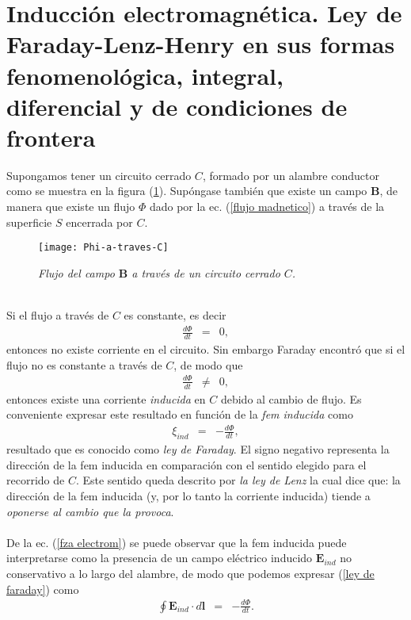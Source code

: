 
\section{Inducción electromagnética. Ley de Faraday-Lenz-Henry en sus formas fenomenológica, integral, diferencial y de condiciones de frontera}
Supongamos tener un circuito cerrado $C$, formado por un alambre conductor como se muestra en la figura (\ref{Phi-a-traves-C}). Supóngase también que existe un campo $\textbf{B}$, de manera que existe un flujo $\Phi$ dado por la ec. (\ref{flujo madnetico}) a través de la superficie $S$ encerrada por $C$.\\
\begin{figure}[h]
  \centering
    \texttt{[image: Phi-a-traves-C]}
        \caption{\emph{Flujo del campo $\textbf{B}$ a través de un circuito cerrado $C$.}}\label{Phi-a-traves-C}
\end{figure}\\
Si el flujo a través de $C$ es constante, es decir
\begin{eqnarray}
\frac{d\Phi}{dt}&=&0,
\end{eqnarray}
entonces no existe corriente en el circuito. Sin embargo Faraday encontró que si el flujo no es constante a través de $C$, de modo que
\begin{eqnarray}
\frac{d\Phi}{dt}&\neq &0,
\end{eqnarray}
entonces existe una corriente \emph{inducida} en $C$ debido al cambio de flujo. Es conveniente expresar este resultado en función de la \emph{fem inducida} como
\begin{eqnarray}
\xi_{ind}&=&-\frac{d\Phi}{dt},\label{ley de faraday}
\end{eqnarray}
resultado que es conocido como \emph{ley de Faraday}. El signo negativo representa la dirección de la fem inducida en comparación con el sentido elegido para el recorrido de $C$. Este sentido queda descrito por \emph{la ley de Lenz} la cual dice que: la dirección de la fem inducida (y, por lo tanto la corriente inducida) tiende a \emph{oponerse al cambio que la provoca}.\\
\\
De la ec. (\ref{fza electrom}) se puede observar que la fem inducida puede interpretarse como la presencia de un campo eléctrico inducido $\textbf{E}_{ind}$ no conservativo a lo largo del alambre, de modo que podemos expresar (\ref{ley de faraday}) como
\begin{eqnarray}
\oint\textbf{E}_{ind}\cdot d\textbf{l}&=&-\frac{d\Phi}{dt}.\label{E ind}
\end{eqnarray}

